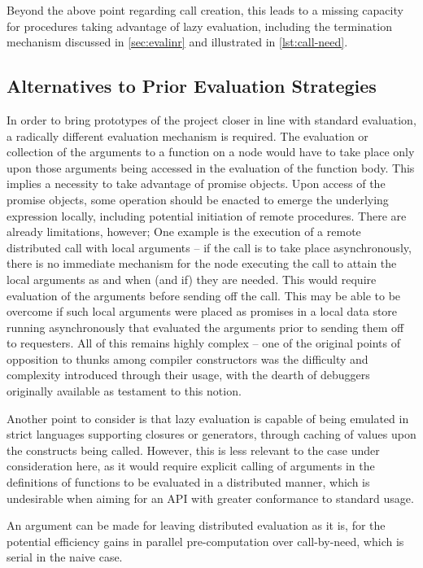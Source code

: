 Beyond the above point regarding call creation, this leads to a missing capacity for procedures taking advantage of lazy evaluation, including the termination mechanism discussed in \cref{sec:evalinr} and illustrated in \cref{lst:call-need}.

\subsection{Alternatives to Prior Evaluation Strategies}

In order to bring prototypes of the project closer in line with standard \R{} evaluation, a radically different evaluation mechanism is required.
The evaluation or collection of the arguments to a function on a node would have to take place only upon those arguments being accessed in the evaluation of the function body.
This implies a necessity to take advantage of promise objects.
Upon access of the promise objects, some operation should be enacted to emerge the underlying expression locally, including potential initiation of remote procedures.
There are already limitations, however; One example is the execution of a remote distributed call with local arguments -- if the call is to take place asynchronously, there is no immediate mechanism for the node executing the call to attain the local arguments as and when (and if) they are needed.
This would require evaluation of the arguments before sending off the call.
This may be able to be overcome if such local arguments were placed as promises in a local data store running asynchronously that evaluated the arguments prior to sending them off to requesters.
All of this remains highly complex -- one of the original points of opposition to thunks \cite{ingerman1961thunks}among compiler constructors was the difficulty and complexity introduced through their usage, with the dearth of debuggers originally available as testament to this notion.

Another point to consider is that lazy evaluation is capable of being emulated in strict languages supporting closures or generators, through caching of values upon the constructs being called.
However, this is less relevant to the case under consideration here, as it would require explicit calling of arguments in the definitions of functions to be evaluated in a distributed manner, which is undesirable when aiming for an API with greater conformance to standard \R{} usage.

An argument can be made for leaving distributed evaluation as it is, for the potential efficiency gains in parallel pre-computation over call-by-need, which is serial in the naive case.


